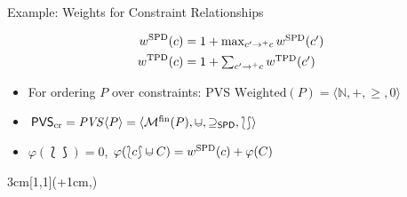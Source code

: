 \begin{frame}{Example: Weights for Constraint Relationships}

\bgroup\abovedisplayskip=-16pt\belowdisplayskip=4pt
\begin{align*}
  w^{\mathrm{SPD}}_{}(c) &\textstyle= 1 + \max_{c' \rightarrow^+ c} w^{\mathrm{SPD}}_{}(c') 
\\
  w^{\mathrm{TPD}}_{}(c) &\textstyle= 1 + \sum_{c' \rightarrow^+ c} w^{\mathrm{TPD}}_{}(c')  
\end{align*}
\egroup

\vspace*{1ex} \small \pause 
\begin{itemize}
\item For ordering $P$ over constraints: PVS $\mathrm{Weighted}(P) = \langle \mathbb{N}, +, \geq, 0 \rangle$
\item $\mathsf{PVS}_{\mathrm{cr}} = \mathit{PVS}\langle P \rangle = \langle \mathcal{M}^{\mathrm{fin}} (P), \mcup, \supseteq_{\mathsf{SPD}}, \lbag \rbag \rangle$
\item $\varphi(\lbag \rbag) = 0$, $\varphi(\lbag c\rbag \mcup C) = \SPDw{}(c) + \varphi(C)$
\end{itemize}



\hfill \cite{Schiendorfer13}
\begin{textblock*}{3cm}[1,1](\textwidth+1cm,\textheight-2.7cm)
\begin{center}
\end{center}
\end{textblock*}
\end{frame}
%
